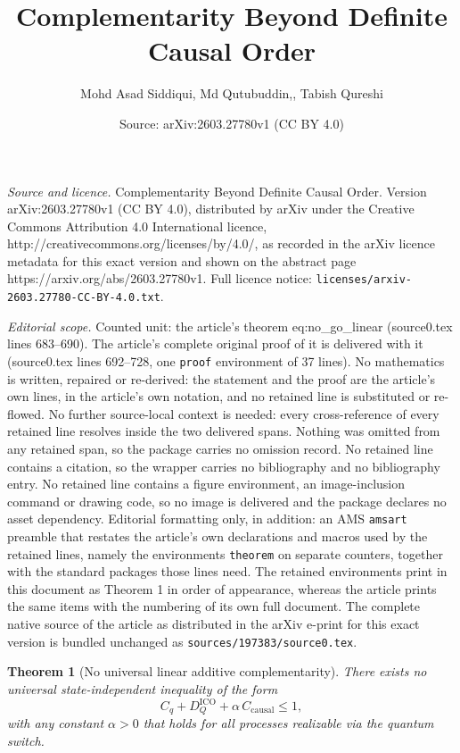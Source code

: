 \documentclass[10pt,a4paper]{amsart}
\title{Complementarity Beyond Definite Causal Order}
\author{Mohd Asad Siddiqui, Md Qutubuddin,, Tabish Qureshi}
\date{Source: arXiv:2603.27780v1 (CC BY 4.0)}
\newtheorem{theorem}{Theorem}
\begin{document}
\maketitle

\noindent\emph{Source and licence.} Complementarity Beyond Definite Causal Order. Version arXiv:2603.27780v1 (CC BY 4.0), distributed by arXiv under the Creative Commons Attribution 4.0 International licence, http://creativecommons.org/licenses/by/4.0/, as recorded in the arXiv licence metadata for this exact version and shown on the abstract page https://arxiv.org/abs/2603.27780v1. Full licence notice: \texttt{licenses/arxiv-2603.27780-CC-BY-4.0.txt}.\par\smallskip

\noindent\textit{Editorial scope.} Counted unit: the article's theorem eq:no\_go\_linear (source0.tex lines 683--690). The article's complete original proof of it is delivered with it (source0.tex lines 692--728, one \texttt{proof} environment of 37 lines). No mathematics is written, repaired or re-derived: the statement and the proof are the article's own lines, in the article's own notation, and no retained line is substituted or re-flowed.  No further source-local context is needed: every cross-reference of every retained line resolves inside the two delivered spans.  Nothing was omitted from any retained span, so the package carries no omission record.  No retained line contains a citation, so the wrapper carries no bibliography and no bibliography entry.  No retained line contains a figure environment, an image-inclusion command or drawing code, so no image is delivered and the package declares no asset dependency.  Editorial formatting only, in addition: an AMS \texttt{amsart} preamble that restates the article's own declarations and macros used by the retained lines, namely the environments \texttt{theorem} on separate counters, together with the standard packages those lines need.  The retained environments print in this document as Theorem 1 in order of appearance, whereas the article prints the same items with the numbering of its own full document.  The complete native source of the article as distributed in the arXiv e-print for this exact version is bundled unchanged as \texttt{sources/197383/source0.tex}.
\begin{theorem}[No universal linear additive complementarity]
There exists no universal state-independent inequality of the form
\begin{equation}
C_q + D_Q^{\mathrm{ICO}} + \alpha\, C_{\mathrm{causal}} \le 1 ,
\label{eq:no_go_linear}
\end{equation}
with any constant $\alpha>0$ that holds for all processes realizable via the quantum switch.
\end{theorem}
\end{document}
